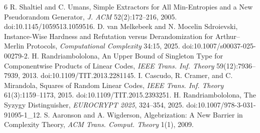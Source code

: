\documentclass[11pt]{article}
\begin{document}
\begin{thebibliography}{6}
 R. Shaltiel and C. Umans, Simple Extractors for All Min-Entropies and a New Pseudorandom Generator, \emph{J. ACM} 52(2):172--216, 2005. doi:10.1145/1059513.1059516.
 D. van Melkebeek and N. Mocelin Sdroievski, Instance-Wise Hardness and Refutation versus Derandomization for Arthur--Merlin Protocols, \emph{Computational Complexity} 34:15, 2025. doi:10.1007/s00037-025-00279-2.
 H. Randriambololona, An Upper Bound of Singleton Type for Componentwise Products of Linear Codes, \emph{IEEE Trans. Inf. Theory} 59(12):7936--7939, 2013. doi:10.1109/TIT.2013.2281145.
 I. Cascudo, R. Cramer, and C. Mirandola, Squares of Random Linear Codes, \emph{IEEE Trans. Inf. Theory} 61(3):1159--1173, 2015. doi:10.1109/TIT.2015.2393251.
 H. Randriambololona, The Syzygy Distinguisher, \emph{EUROCRYPT 2025}, 324--354, 2025. doi:10.1007/978-3-031-91095-1_12.
 S. Aaronson and A. Wigderson, Algebrization: A New Barrier in Complexity Theory, \emph{ACM Trans. Comput. Theory} 1(1), 2009.
\end{thebibliography}
\end{document}
